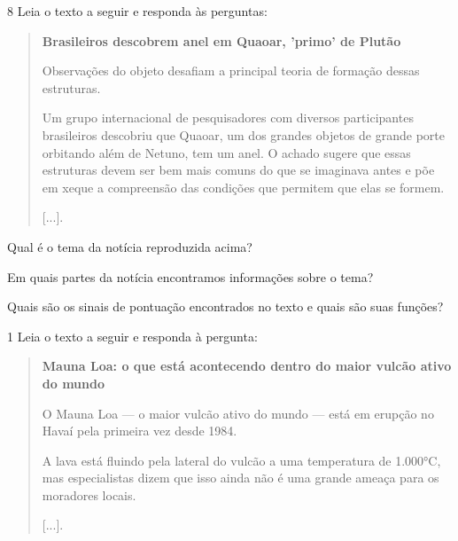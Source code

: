 \num{8} Leia o texto a seguir e responda às perguntas:

\begin{quote}
\textbf{Brasileiros descobrem anel em Quaoar, 'primo' de Plutão}

Observações do objeto desafiam a principal teoria de formação
dessas estruturas.

Um grupo internacional de pesquisadores com diversos participantes
brasileiros descobriu que Quaoar, um dos grandes objetos de grande porte
orbitando além de Netuno, tem um anel. O achado sugere que essas
estruturas devem ser bem mais comuns do que se imaginava antes e põe em
xeque a compreensão das condições que permitem que elas se formem.

{[}...{]}.

\end{quote}

\begin{escolha}
\item Qual é o tema da notícia reproduzida acima?



\item Em quais partes da notícia encontramos informações sobre o tema?


\item Quais são os sinais de pontuação encontrados no texto e quais são
suas funções?

\end{escolha}



\num{1} Leia o texto a seguir e responda à pergunta:


\begin{quote}
\textbf{Mauna Loa: o que está acontecendo dentro do maior vulcão ativo do mundo}

O Mauna Loa --- o maior vulcão ativo do mundo --- está em erupção no
Havaí pela primeira vez desde 1984.

A lava está fluindo pela lateral do vulcão a uma temperatura de 1.000°C,
mas especialistas dizem que isso ainda não é uma grande ameaça para os
moradores locais.

{[}...{]}.
\end{quote}

